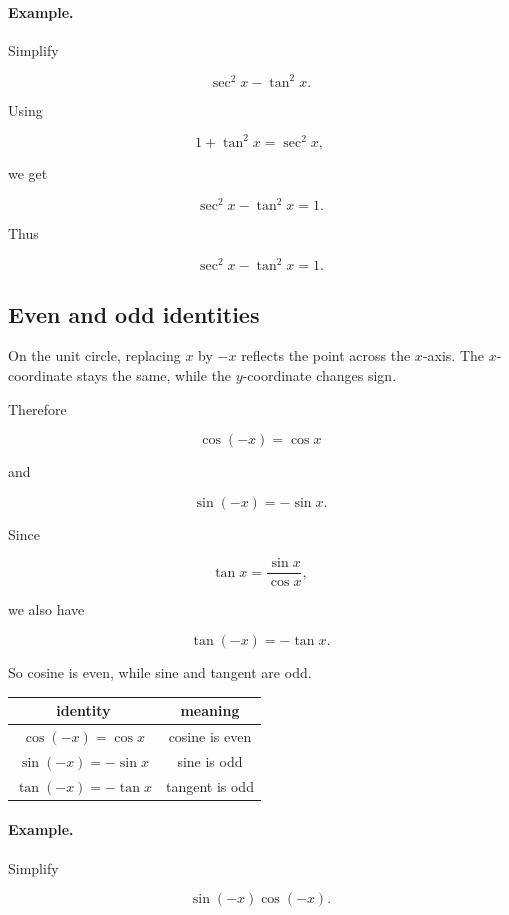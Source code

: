 \paragraph{Example.}
Simplify

\[
\sec^2 x-\tan^2 x.
\]

Using

\[
1+\tan^2 x=\sec^2 x,
\]

we get

\[
\sec^2 x-\tan^2 x=1.
\]

Thus

\[
\boxed{
\sec^2 x-\tan^2 x=1.
}
\]

\subsection{Even and odd identities}
\label{appsubsec:even-odd-trig-identities}

On the unit circle, replacing \(x\) by \(-x\) reflects the point across the \(x\)-axis.
The \(x\)-coordinate stays the same, while the \(y\)-coordinate changes sign.

Therefore

\[
\boxed{
\cos(-x)=\cos x
}
\]

and

\[
\boxed{
\sin(-x)=-\sin x.
}
\]

Since

\[
\tan x=\frac{\sin x}{\cos x},
\]

we also have

\[
\boxed{
\tan(-x)=-\tan x.
}
\]

So cosine is even, while sine and tangent are odd.

\begin{center}
\renewcommand{\arraystretch}{1.5}
\begin{tabular}{c|c}
\textbf{identity} & \textbf{meaning} \\ \hline
\(\cos(-x)=\cos x\) & cosine is even \\
\(\sin(-x)=-\sin x\) & sine is odd \\
\(\tan(-x)=-\tan x\) & tangent is odd
\end{tabular}
\end{center}

\paragraph{Example.}
Simplify

\[
\sin(-x)\cos(-x).
\]

